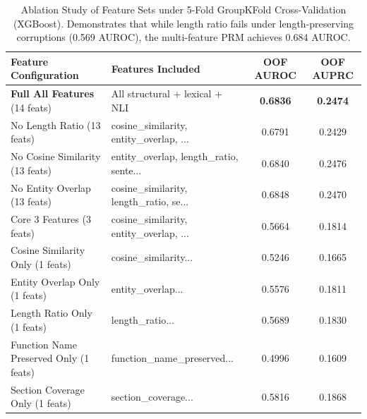\begin{table}[t]
\centering
\small
\caption{Ablation Study of Feature Sets under 5-Fold GroupKFold Cross-Validation (XGBoost). Demonstrates that while length ratio fails under length-preserving corruptions (0.569 AUROC), the multi-feature PRM achieves 0.684 AUROC.}
\label{tab:feature_ablation}
\begin{tabular}{llcc}
\toprule
\textbf{Feature Configuration} & \textbf{Features Included} & \textbf{OOF AUROC} & \textbf{OOF AUPRC} \\
\midrule
\textbf{Full All Features} (14 feats) & All structural + lexical + NLI & \textbf{0.6836} & \textbf{0.2474} \\
No Length Ratio (13 feats) & cosine_similarity, entity_overlap, ... & 0.6791 & 0.2429 \\
No Cosine Similarity (13 feats) & entity_overlap, length_ratio, sente... & 0.6840 & 0.2476 \\
No Entity Overlap (13 feats) & cosine_similarity, length_ratio, se... & 0.6848 & 0.2470 \\
Core 3 Features (3 feats) & cosine_similarity, entity_overlap, ... & 0.5664 & 0.1814 \\
Cosine Similarity Only (1 feats) & cosine_similarity... & 0.5246 & 0.1665 \\
Entity Overlap Only (1 feats) & entity_overlap... & 0.5576 & 0.1811 \\
Length Ratio Only (1 feats) & length_ratio... & 0.5689 & 0.1830 \\
Function Name Preserved Only (1 feats) & function_name_preserved... & 0.4996 & 0.1609 \\
Section Coverage Only (1 feats) & section_coverage... & 0.5816 & 0.1868 \\
\bottomrule
\end{tabular}
\end{table}
